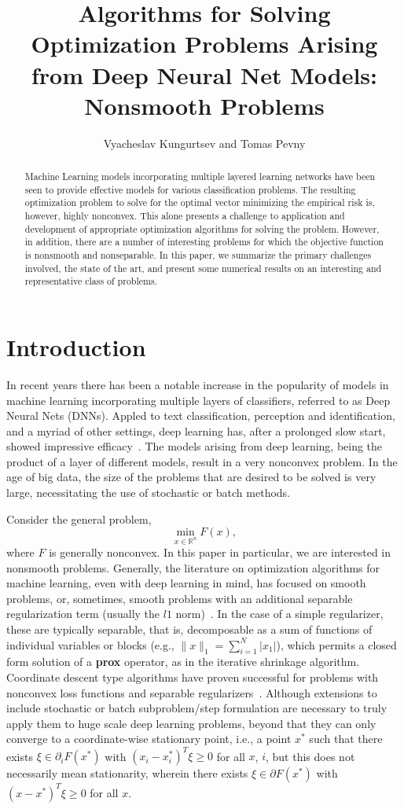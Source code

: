 \documentclass[psamsfonts,onesided,10pt]{amsart}
\title{Algorithms for Solving Optimization Problems Arising from Deep Neural Net Models: Nonsmooth Problems}
\author{Vyacheslav Kungurtsev and Tomas Pevny}
\theoremstyle{definition}
\theoremstyle{remark}
\numberwithin{equation}{section}
\begin{document}
\begin{abstract}
Machine Learning models incorporating multiple layered learning networks have been seen to provide effective
models for various classification problems. The resulting optimization problem to solve for the optimal vector
minimizing the empirical risk is, however, highly nonconvex. This alone presents a challenge to application and development
of appropriate optimization algorithms for solving the problem. However, in addition, there are a number of interesting
problems for which the objective function is nonsmooth and nonseparable. In this paper, we summarize the primary challenges
involved, the state of the art, and present some numerical results on an interesting and representative class of problems.
\end{abstract}
\maketitle




\section{Introduction}
In recent years there has been a notable increase in the popularity of models in machine learning incorporating multiple 
layers of classifiers, referred to as Deep Neural Nets (DNNs). 
Appled to text classification, perception and identification, and a myriad of other settings, deep learning
has, after a prolonged slow start, showed impressive efficacy~\cite{lecun2015deep}. The models arising from 
deep learning, being the product of a layer of different models, result in a very nonconvex problem. In the age
of big data, the size of the problems that are desired to be solved is very large, necessitating the use
of stochastic or batch methods. 

Consider the general problem,
\[
\min_{x\in\mathbb{R}^n} F(x),
\]
where $F$ is generally nonconvex. In this paper in particular, we are interested in nonsmooth problems. Generally, the literature
on optimization algorithms for machine learning, even with deep learning in mind, has focused on smooth problems,
or, sometimes, smooth problems with an additional separable regularization term (usually the $l1$ norm)~\cite{bottou2016optimization}.
In the case of a simple regularizer, these are typically separable, that is, decomposable as a sum of functions
of individual variables or blocks (e.g., $\|x\|_1 = \sum_{i=1}^N |x_1|$), which permits a closed form 
solution of a \textbf{prox} operator, as in the iterative shrinkage algorithm. Coordinate descent type algorithms
have proven successful for problems with nonconvex loss functions and separable 
regularizers~\cite{richtarik2016parallel, daneshmand2015hybrid}. Although extensions to include stochastic or batch
subproblem/step formulation are necessary to truly apply them to huge scale deep learning problems, beyond that
they can only converge to a coordinate-wise stationary point, i.e., a point $x^*$ such that there exists $\xi\in\partial_i F(x^*)$
with $(x_i-x_i^*)^T \xi\ge 0$ for all $x$, $i$, but this does not necessarily mean stationarity, wherein there exists $\xi\in\partial F(x^*)$
with $(x-x^*)^T\xi\ge 0$ for all $x$.
\end{document}
